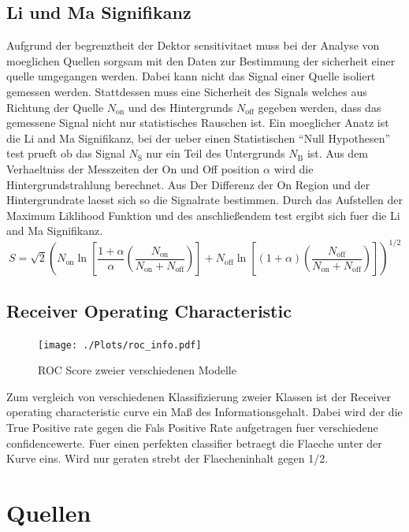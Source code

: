 \subsection{Li und Ma Signifikanz}
Aufgrund der begrenztheit der Dektor sensitivitaet muss bei der Analyse von moeglichen Quellen sorgsam mit den Daten zur Bestimmung der sicherheit einer quelle umgegangen werden.
Dabei kann nicht das Signal einer Quelle isoliert gemessen werden. 
Stattdessen muss eine Sicherheit des Signals welches aus Richtung der Quelle $N_\text{on}$ und des Hintergrunds $N_\text{off}$ gegeben werden, dass das gemessene Signal nicht nur statistisches Rauschen ist.
Ein moeglicher Anatz ist die Li and Ma Signifikanz, bei der ueber einen Statistischen ``Null Hypothesen'' test prueft ob das Signal $N_\text{S}$ nur ein Teil des Untergrunds $N_\text{B}$ ist. 
Aus dem Verhaeltniss der Messzeiten der On und Off position $\alpha$ wird die Hintergrundstrahlung berechnet. 
Aus Der Differenz der On Region und der Hintergrundrate laesst sich so die Signalrate bestimmen. 
Durch das Aufstellen der Maximum Liklihood Funktion und des anschließendem test ergibt sich fuer die Li and Ma Signifikanz.
\begin{equation}
S = \sqrt{2} \left( N_\text{on} \ln \left[ \frac{1+ \alpha}{\alpha}\left( \frac{N_\text{on}}{N_\text{on} + N_\text{off}} \right) \right] + N_\text{off} \ln \left[ \left( 1+ \alpha \right) \left( \frac{N_\text{off}}{N_\text{on} + N_\text{off}} \right) \right] \right)^{1/2}
\end{equation}

\subsection{Receiver Operating Characteristic}
\begin{figure}
  \centering
  \texttt{[image: ./Plots/roc\_info.pdf]}
  \caption{ROC Score zweier verschiedenen Modelle}
\end{figure}
Zum vergleich von verschiedenen Klassifizierung zweier Klassen ist der Receiver operating characteristic curve ein Maß des Informationsgehalt. 
Dabei wird der die True Positive rate gegen die Fals Positive Rate aufgetragen fuer verschiedene confidencewerte. 
Fuer einen perfekten classifier betraegt die Flaeche unter der Kurve eins. 
Wird nur geraten strebt der Flaecheninhalt gegen 1/2.

\section{Quellen}

